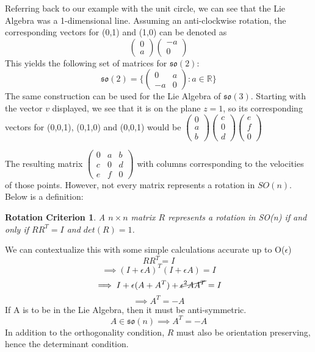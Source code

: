 \documentclass{article}
\newtheorem*{remark}{Rotation Criterion}
\begin{document}
\begin{minipage}{0.55\linewidth}
    Referring back to our example with the unit circle, we can see that the Lie Algebra was a 1-dimensional line. Assuming an anti-clockwise rotation, the corresponding vectors for (0,1) and (1,0) can be denoted as 
    \[\begin{pmatrix}0\\a\end{pmatrix} \begin{pmatrix}-a\\0\end{pmatrix}\]
    This yields the following set of matrices for $\mathfrak{so}(2)$: 
    \[\mathfrak{so}(2) = \{\begin{pmatrix}0&a\\-a&0\end{pmatrix} : a \in \mathbb{R}\}\]
    The same construction can be used for the Lie Algebra of $\mathfrak{so}(3)$. Starting with the vector $v$ displayed, we see that it is on the plane $z=1$, so its corresponding vectors for (0,0,1), (0,1,0) and (0,0,1) would be $\begin{pmatrix}0\\a\\b\end{pmatrix}$$\begin{pmatrix}c\\0\\d\end{pmatrix}$$\begin{pmatrix}e\\f\\0\end{pmatrix}$
\end{minipage}
The resulting matrix $\begin{pmatrix}0&a&b\\c&0&d\\e&f&0\end{pmatrix}$ with columns corresponding to the velocities of those points. However, not every matrix represents a rotation in $SO(n)$. Below is a definition:
\begin{remark}
    A $n\times n$ matrix $R$ represents a rotation in SO(n) if and only if $RR^{T} = I$ and $det(R) = 1$.
\end{remark}
We can contextualize this with some simple calculations accurate up to O($\epsilon$) \[RR^{T} = I\]
\[\implies(I + \epsilon A)^{T}(I + \epsilon A) = I\]
\[\implies I + \epsilon(A + A^{T}) + \cancel{\epsilon^{2}AA^{T}} = I\]
\[\implies A^{T} = -A\]
If A is to be in the Lie Algebra, then it must be anti-symmetric.
\[A \in \mathfrak{so}(n) \implies A^{T} = -A\]
In addition to the orthogonality condition, $R$ must also be orientation preserving, hence the determinant condition.
\end{document}
